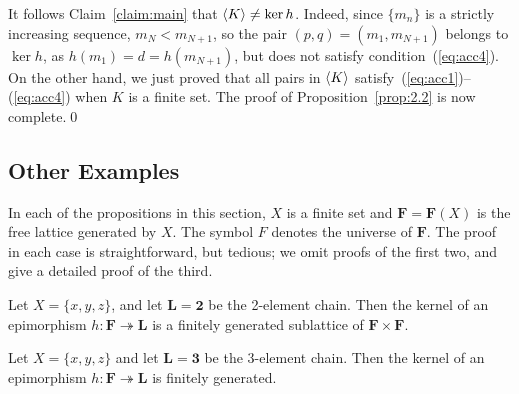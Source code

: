 It follows Claim~\ref{claim:main} that 
$\langle K\rangle \neq \ker h$. Indeed, since $\{m_n\}$ is a strictly increasing sequence, 
$m_N < m_{N+1}$, so the pair $(p, q) = (m_1, m_{N+1})$ belongs to $\ker h$, as 
$h(m_1) = d = h(m_{N+1})$, but does not satisfy condition~(\ref{eq:acc4}). On 
the other hand, we just proved that all pairs in $\langle K\rangle$ 
satisfy~(\ref{eq:acc1})--(\ref{eq:acc4}) when $K$ is a finite set.   The 
proof of Proposition~\ref{prop:2.2} is now complete.\qed




\subsection{Other Examples}
In each of the propositions in this section, $X$ is a finite set and 
$\mathbf{F} = \mathbf{F}(X)$ is the free lattice generated by $X$.
The symbol $F$ denotes the universe of $\mathbf{F}$.  
The proof in each case is straightforward, but tedious;
we omit proofs of the first two, and give a detailed proof of the third.
\begin{prop}\label{prop:1}
Let $X = \{x,y,z\}$, and let $\mathbf{L} = \mathbf{2}$ be the 2-element chain.    
Then the kernel of an epimorphism $h\colon \mathbf{F} \twoheadrightarrow \mathbf{L}$ 
is a finitely generated sublattice of $\mathbf{F} \times \mathbf{F}$.
\end{prop}

\begin{prop}\label{prop:2} 
Let $X = \{x, y, z\}$ and let $\mathbf{L} = \mathbf{3}$ be the 3-element chain.    
Then the kernel of an epimorphism $h\colon \mathbf{F} \twoheadrightarrow \mathbf{L}$ 
is finitely generated.
\end{prop}

